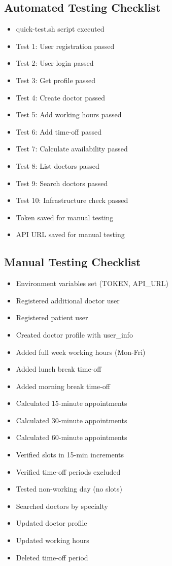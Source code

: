 \documentclass[12pt,a4paper]{article}
\begin{document}
\subsection{Automated Testing Checklist}
\begin{itemize}[label=$\square$]
    \item quick-test.sh script executed
    \item Test 1: User registration passed
    \item Test 2: User login passed
    \item Test 3: Get profile passed
    \item Test 4: Create doctor passed
    \item Test 5: Add working hours passed
    \item Test 6: Add time-off passed
    \item Test 7: Calculate availability passed
    \item Test 8: List doctors passed
    \item Test 9: Search doctors passed
    \item Test 10: Infrastructure check passed
    \item Token saved for manual testing
    \item API URL saved for manual testing
\end{itemize}

\subsection{Manual Testing Checklist}
\begin{itemize}[label=$\square$]
    \item Environment variables set (TOKEN, API\_URL)
    \item Registered additional doctor user
    \item Registered patient user
    \item Created doctor profile with user\_info
    \item Added full week working hours (Mon-Fri)
    \item Added lunch break time-off
    \item Added morning break time-off
    \item Calculated 15-minute appointments
    \item Calculated 30-minute appointments
    \item Calculated 60-minute appointments
    \item Verified slots in 15-min increments
    \item Verified time-off periods excluded
    \item Tested non-working day (no slots)
    \item Searched doctors by specialty
    \item Updated doctor profile
    \item Updated working hours
    \item Deleted time-off period
\end{itemize}
\end{document}
